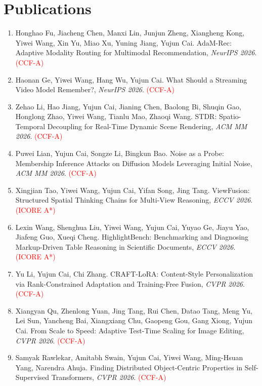 \section*{Publications}
\begin{enumerate}
\item Honghao Fu, Jiacheng Chen, Manxi Lin, Junjun Zheng, Xiangheng Kong, Yiwei Wang, Xin Yu, Miao Xu, Yuning Jiang, Yujun Cai. AdaM-Rec: Adaptive Modality Routing for Multimodal Recommendation, \textit{NeurIPS 2026}. \textcolor{red}{(CCF-A)}

\item Haonan Ge, Yiwei Wang, Hang Wu, Yujun Cai. What Should a Streaming Video Model Remember?, \textit{NeurIPS 2026}. \textcolor{red}{(CCF-A)}

\item Zehao Li, Hao Jiang, Yujun Cai, Jianing Chen, Baolong Bi, Shuqin Gao, Honglong Zhao, Yiwei Wang, Tianlu Mao, Zhaoqi Wang. STDR: Spatio-Temporal Decoupling for Real-Time Dynamic Scene Rendering, \textit{ACM MM 2026}. \textcolor{red}{(CCF-A)}

\item Puwei Lian, Yujun Cai, Songze Li, Bingkun Bao. Noise as a Probe: Membership Inference Attacks on Diffusion Models Leveraging Initial Noise, \textit{ACM MM 2026}. \textcolor{red}{(CCF-A)}

\item Xingjian Tao, Yiwei Wang, Yujun Cai, Yifan Song, Jing Tang. ViewFusion: Structured Spatial Thinking Chains for Multi-View Reasoning, \textit{ECCV 2026}. \textcolor{red}{(ICORE A*)}

\item Lexin Wang, Shenghua Liu, Yiwei Wang, Yujun Cai, Yuyao Ge, Jiayu Yao, Jiafeng Guo, Xueqi Cheng. HighlightBench: Benchmarking and Diagnosing Markup-Driven Table Reasoning in Scientific Documents, \textit{ECCV 2026}. \textcolor{red}{(ICORE A*)}

\item Yu Li, Yujun Cai, Chi Zhang. CRAFT-LoRA: Content-Style Personalization via Rank-Constrained Adaptation and Training-Free Fusion, \textit{CVPR 2026}. \textcolor{red}{(CCF-A)}

\item Xiangyan Qu, Zhenlong Yuan, Jing Tang, Rui Chen, Datao Tang, Meng Yu, Lei Sun, Yancheng Bai, Xiangxiang Chu, Gaopeng Gou, Gang Xiong, Yujun Cai. From Scale to Speed: Adaptive Test-Time Scaling for Image Editing, \textit{CVPR 2026}. \textcolor{red}{(CCF-A)}

\item Samyak Rawlekar, Amitabh Swain, Yujun Cai, Yiwei Wang, Ming-Hsuan Yang, Narendra Ahuja. Finding Distributed Object-Centric Properties in Self-Supervised Transformers, \textit{CVPR 2026}. \textcolor{red}{(CCF-A)}


\end{enumerate}
